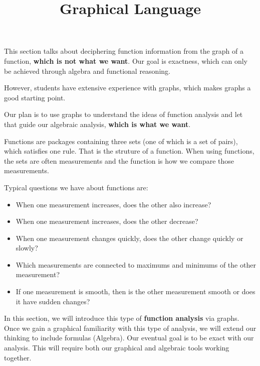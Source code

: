 \documentclass{ximera}
\title{Graphical Language}
\begin{document}
\begin{abstract}
\end{abstract}
\maketitle



\begin{warning}


This section talks about deciphering function information from the graph of a function, \textbf{\textcolor{red!70!black}{which is not what we want}}.  Our goal is exactness, which can only be achieved through algebra and functional reasoning.

However, students have extensive experience with graphs, which makes graphs a good starting point. 

Our plan is to use graphs to understand the ideas of function analysis and let that guide our algebraic analysis, \textbf{\textcolor{red!70!black}{which is what we want}}.

\end{warning}




Functions are packages containing three sets (one of which is a set of pairs), which satisfies one rule.  That is the struture of a function.  When using functions, the sets are often measurements and the function is how we compare those measurements.

Typical questions we have about functions are:

\begin{itemize}
\item When one measurement increases, does the other also increase?
\item When one measurement increases, does the other decrease?
\item When one measurement changes quickly, does the other change quickly or slowly?
\item Which measurements are connected to maximums and minimums of the other measurement?
\item If one measurement is smooth, then is the other measurement smooth or does it have sudden changes?
\end{itemize}


In this section, we will introduce this type of \textbf{function analysis} via graphs. Once we gain a graphical familiarity with this type of analysis, we will extend our thinking to include formulas (Algebra).  Our eventual goal is to be exact with our analysis.  This will require both our graphical and algebraic tools working together.
\end{document}
